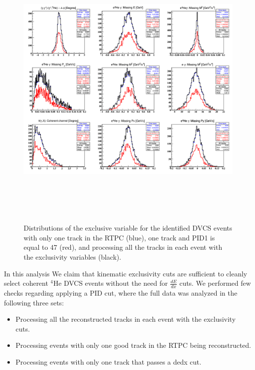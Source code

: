 \begin{figure}[tbp]
      \hspace{-0.5cm}
      \includegraphics[height=14.2cm]{fig_dvcs/all_coh_pid.png}
      \caption{Distributions of the exclusive variable for the identified DVCS 
      events with only one track in the RTPC (blue), one track and PID1 is 
      equal to 47 (red), and processing all the tracks in each event with the 
      exclusivity variables (black).}
      \label{fig:dedx_check}
\end{figure}


In this analysis We claim that kinematic exclusivity cuts are sufficient to
cleanly select coherent $^4$He DVCS events without the need for $\frac{dE}{dx}$
cuts. We performed few checks regarding applying a PID cut, where the full data
was analyzed in the following three sets:\\
\begin{itemize}
\item Processing all the reconstructed tracks in each event with the exclusivity
cuts.\\
\item Processing events with only one good track in the RTPC being
reconstructed.\\
\item Processing events with only one track that passes a dedx cut.\\
\end{itemize}

